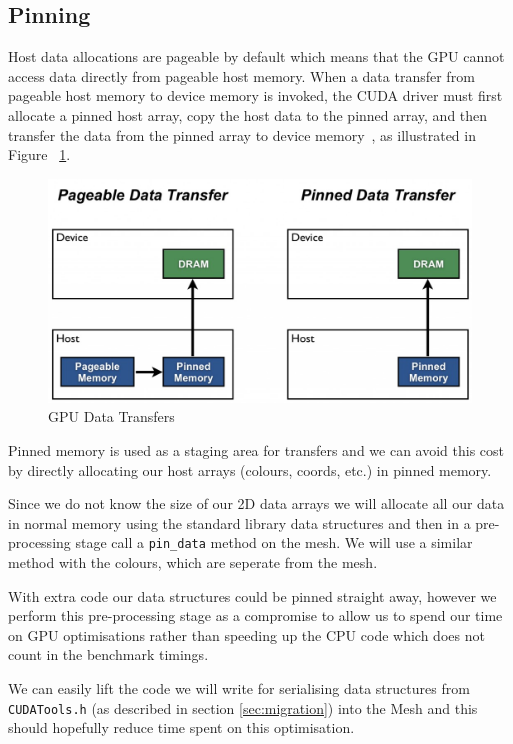 \subsection{Pinning}
Host data allocations are pageable by default which means that the GPU cannot access data directly from pageable host memory. When a data transfer from pageable host memory to device memory is invoked, the CUDA driver must first allocate a pinned host array, copy the host data to the pinned array, and then transfer the data from the pinned array to device memory~\cite{transfer}, as illustrated in Figure ~\ref{fig:pinning}.
\begin{figure}[H]
  \centering
  \includegraphics[scale=0.3]{images/pinning}
  \caption[pinning]{GPU Data Transfers~\cite{transfer}}
  \label{fig:pinning}
\end{figure}
Pinned memory is used as a staging area for transfers and we can avoid this cost by directly allocating our host arrays (colours, coords, etc.) in pinned memory.

Since we do not know the size of our 2D data arrays we will allocate all our data in normal memory using the standard library data structures and then in a pre-processing stage call a \verb!pin_data! method on the mesh. We will use a similar method with the colours, which are seperate from the mesh.

With extra code our data structures could be pinned straight away, however we perform this pre-processing stage as a compromise to allow us to spend our time on GPU optimisations rather than speeding up the CPU code which does not count in the benchmark timings.

We can easily lift the code we will write for serialising data structures from \verb!CUDATools.h! (as described in section \ref{sec:migration}) into the Mesh and this should hopefully reduce time spent on this optimisation.